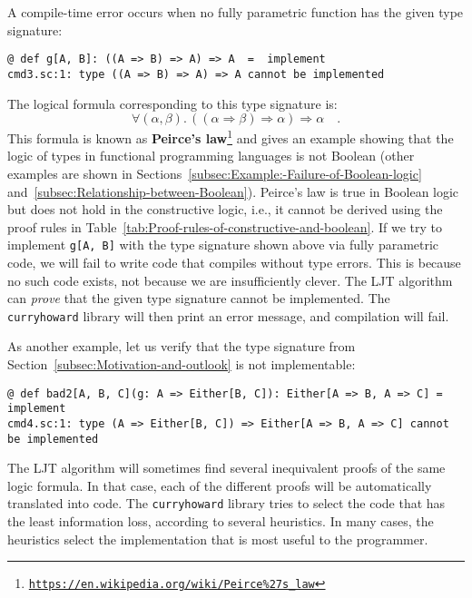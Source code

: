 A compile-time error occurs when no fully parametric function has
the given type signature:
\begin{lstlisting}
@ def g[A, B]: ((A => B) => A) => A  =  implement
cmd3.sc:1: type ((A => B) => A) => A cannot be implemented
\end{lstlisting}
The logical formula corresponding to this type signature is:
\begin{equation}
\forall(\alpha,\beta).\,\left(\left(\alpha\Rightarrow\beta\right)\Rightarrow\alpha\right)\Rightarrow\alpha\quad.\label{eq:ch-example-3-peirce-law}
\end{equation}
This formula is known as \textbf{Peirce\textsf{'}s law}\footnote{\texttt{\href{https://en.wikipedia.org/wiki/Peirce\%27s_law}{https://en.wikipedia.org/wiki/Peirce\%27s\_law}}}
and gives an example showing that the logic of types in functional
programming languages is not Boolean (other examples are shown in
Sections~\ref{subsec:Example:-Failure-of-Boolean-logic} and~\ref{subsec:Relationship-between-Boolean}).
Peirce\textsf{'}s law is true in Boolean logic but does not hold in the constructive
logic, i.e., it cannot be derived using the proof rules in Table~\ref{tab:Proof-rules-of-constructive-and-boolean}.
If we try to implement \lstinline!g[A, B]! with the type signature
shown above via fully parametric code, we will fail to write code
that compiles without type errors. This is because no such code exists,
\textemdash{} not because we are insufficiently clever. The LJT algorithm
can \emph{prove} that the given type signature cannot be implemented.
The \lstinline!curryhoward! library will then print an error message,
and compilation will fail.

As another example, let us verify that the type signature from Section~\ref{subsec:Motivation-and-outlook}
is not implementable:
\begin{lstlisting}
@ def bad2[A, B, C](g: A => Either[B, C]): Either[A => B, A => C] = implement
cmd4.sc:1: type (A => Either[B, C]) => Either[A => B, A => C] cannot be implemented
\end{lstlisting}

The LJT algorithm will sometimes find several inequivalent proofs
of the same logic formula. In that case, each of the different proofs
will be automatically translated into code. The \lstinline!curryhoward!
library tries to select the code that has the least information loss,
according to several heuristics. In many cases, the heuristics select
the implementation that is most useful to the programmer.

